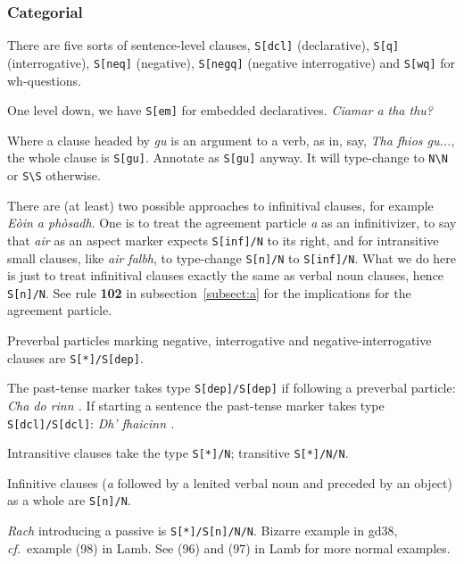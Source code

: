 \documentclass[a4paper]{article}
\begin{document}
\subsubsection*{Categorial}
 There are five sorts of sentence-level clauses, \texttt{S[dcl]} (declarative), \texttt{S[q]} (interrogative), \texttt{S[neq]} (negative), \texttt{S[negq]} (negative interrogative) and \texttt{S[wq]} for wh-questions.

 One level down, we have \texttt{S[em]} for embedded declaratives.
\textit{Ciamar a tha thu?}

 Where a clause headed by \textit{gu} is an argument to a verb, as in, say, \textit{Tha fhios gu...}, the whole clause is \texttt{S[gu]}.
Annotate as \texttt{S[gu]} anyway.
It will type-change to \texttt{N\textbackslash N} or \texttt{S\textbackslash S} otherwise.

 There are (at least) two possible approaches to infinitival clauses, for example \textit{E\`oin a ph\`osadh}.
One is to treat the agreement particle \textit{a} as an infinitivizer, to say that \textit{air} as an aspect marker expects \texttt{S[inf]/N} to its right, and for intransitive small clauses, like \textit{air falbh}, to type-change \texttt{S[n]/N} to \texttt{S[inf]/N}.
What we do here is just to treat infinitival clauses exactly the same as verbal noun clauses, hence \texttt{S[n]/N}.
See rule {\bf 102} in subsection~\ref{subsect:a} for the implications for the agreement particle.

 Preverbal particles marking negative, interrogative and negative-interrogative clauses are \texttt{S[*]/S[dep]}.

 The past-tense marker takes type \texttt{S[dep]/S[dep]} if following a preverbal particle: \textit{Cha do rinn .}
If starting a sentence the past-tense marker takes type \texttt{S[dcl]/S[dcl]}: \textit{Dh' fhaicinn .}

 Intransitive clauses take the type \texttt{S[*]/N}; transitive \texttt{S[*]/N/N}.

 Infinitive clauses (\textit{a} followed by a lenited verbal noun and preceded by an object) as a whole are \texttt{S[n]/N}.

 \textit{Rach} introducing a passive is \texttt{S[*]/S[n]/N/N}.
Bizarre example in gd38, \textit{cf.}~example (98) in Lamb.
See (96) and (97) in Lamb for more normal examples.
\end{document}
